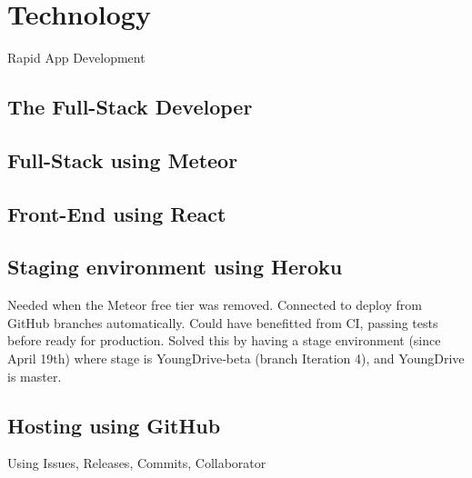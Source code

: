 \section{Technology}

Rapid App Development
    
  \subsection{The Full-Stack Developer}

  \subsection{Full-Stack using Meteor}

  \subsection{Front-End using React}
  
  \subsection{Staging environment using Heroku}
  Needed when the Meteor free tier was removed. Connected to deploy from GitHub branches automatically. Could have benefitted from CI, passing tests before ready for production. Solved this by having a stage environment (since April 19th) where stage is YoungDrive-beta (branch Iteration 4), and YoungDrive is master.
  
  \subsection{Hosting using GitHub}
  Using Issues, Releases, Commits, Collaborator